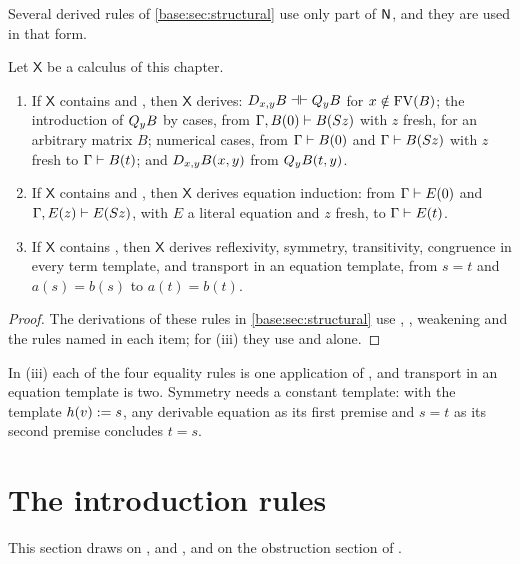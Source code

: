 Several derived rules of \cref{base:sec:structural} use only part of $\mathsf{N}$,
and they are used in that form.

\begin{lemma}
\label{kern:lem:local}
Let $\mathsf{X}$ be a calculus of this chapter.
\begin{enumerate}[label=\textup{(\roman*)}]
\item If $\mathsf{X}$ contains  and , then
 $\mathsf{X}$ derives: $D_{x,y}B\dashv\vdash Q_{y}B$ for
 $x\notin\operatorname{FV}(B)$; the introduction of $Q_{y}B$ by cases, from
 $\Gamma,B(0)\vdash B(S z)$ with $z$ fresh, for an arbitrary matrix $B$;
 numerical cases, from $\Gamma\vdash B(0)$ and $\Gamma\vdash B(S z)$
 with $z$ fresh to $\Gamma\vdash B(t)$; and $D_{x,y}B(x,y)$ from
 $Q_{y}B(t,y)$.
\item If $\mathsf{X}$ contains  and , then
 $\mathsf{X}$ derives equation induction: from $\Gamma\vdash E(0)$ and
 $\Gamma,E(z)\vdash E(S z)$, with $E$ a literal equation and $z$ fresh,
 to $\Gamma\vdash E(t)$.
\item If $\mathsf{X}$ contains , then $\mathsf{X}$ derives
 reflexivity, symmetry, transitivity, congruence in every term template, and
 transport in an equation template, from $s=t$ and $a(s)=b(s)$ to
 $a(t)=b(t)$.
\end{enumerate}
\end{lemma}

\begin{proof}
The derivations of these rules in \cref{base:sec:structural} use
, , weakening and the rules named in each item;
for (iii) they use  and  alone.
\end{proof}

In (iii) each of the four equality rules is one application of
, and transport in an equation template is two.  Symmetry needs
a constant template:  with the template $h(v)\mathrel{:=} s$, any
derivable equation as its first premise and $s=t$ as its second premise
concludes $t=s$.

\section{The introduction rules}
\label{kern:sec:intro}

This section draws on , 
and , and on the obstruction section of
.


